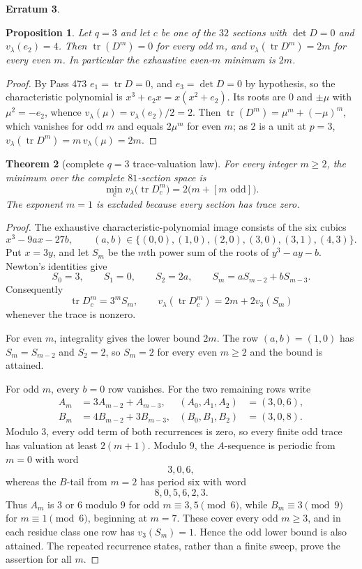 \documentclass[11pt]{article}
\theoremstyle{plain}
\newtheorem{theorem}{Theorem}
\newtheorem{proposition}[theorem]{Proposition}
\theoremstyle{definition}
\newtheorem{erratum}[theorem]{Erratum}
\newcommand{\tr}{\operatorname{tr}}
\newcommand{\vlam}{v_\lambda}
\begin{document}
\begin{erratum}
\begin{proposition}\label{prop:q3even}
Let $q=3$ and let $c$ be one of the $32$ sections with $\det D=0$ and
$\vlam(e_2)=4$. Then $\tr(D^m)=0$ for every odd $m$, and
$\vlam(\tr D^m)=2m$ for every even $m$. In particular the exhaustive even-$m$
minimum is $2m$.
\end{proposition}

\begin{proof}
By Pass 473 $e_1=\tr D=0$, and $e_3=\det D=0$ by hypothesis, so the
characteristic polynomial is $x^3+e_2x=x(x^2+e_2)$. Its roots are $0$ and
$\pm\mu$ with $\mu^2=-e_2$, whence $\vlam(\mu)=\vlam(e_2)/2=2$. Then
$\tr(D^m)=\mu^m+(-\mu)^m$, which vanishes for odd $m$ and equals $2\mu^m$ for
even $m$; as $2$ is a unit at $p=3$, $\vlam(\tr D^m)=m\,\vlam(\mu)=2m$.
\end{proof}

\begin{theorem}[complete $q=3$ trace-valuation law]\label{thm:q3allm}
For every integer $m\ge2$, the minimum over the complete $81$-section space is
\[
 \min_c\vlam\bigl(\tr D_c^m\bigr)
   =2\bigl(m+[m\text{ odd}]\bigr).
\]
The exponent $m=1$ is excluded because every section has trace zero.
\end{theorem}

\begin{proof}
The exhaustive characteristic-polynomial image consists of the six cubics
\[
 x^3-9a x-27b,
 \qquad
 (a,b)\in\{(0,0),(1,0),(2,0),(3,0),(3,1),(4,3)\}.
\]
Put $x=3y$, and let $S_m$ be the $m$th power sum of the roots of
$y^3-ay-b$. Newton's identities give
\[
 S_0=3,\qquad S_1=0,\qquad S_2=2a,\qquad
 S_m=aS_{m-2}+bS_{m-3}.
\]
Consequently
\[
 \tr D_c^m=3^mS_m,
 \qquad
 \vlam(\tr D_c^m)=2m+2v_3(S_m)
\]
whenever the trace is nonzero.

For even $m$, integrality gives the lower bound $2m$.  The row
$(a,b)=(1,0)$ has $S_m=S_{m-2}$ and $S_2=2$, so $S_m=2$ for every even
$m\ge2$ and the bound is attained.

For odd $m$, every $b=0$ row vanishes. For the two remaining rows write
\[
 \begin{aligned}
 A_m&=3A_{m-2}+A_{m-3}, &(A_0,A_1,A_2)&=(3,0,6),\\
 B_m&=4B_{m-2}+3B_{m-3}, &(B_0,B_1,B_2)&=(3,0,8).
 \end{aligned}
\]
Modulo $3$, every odd term of both recurrences is zero, so every finite odd
trace has valuation at least $2(m+1)$. Modulo $9$, the $A$-sequence is
periodic from $m=0$ with word
\[
 3,0,6,
\]
whereas the $B$-tail from $m=2$ has period six with word
\[
 8,0,5,6,2,3.
\]
Thus $A_m$ is $3$ or $6$ modulo $9$ for odd
$m\equiv3,5\pmod6$, while $B_m\equiv3\pmod9$ for
$m\equiv1\pmod6$, beginning at $m=7$. These cover every odd $m\ge3$, and in
each residue class one row has $v_3(S_m)=1$. Hence the odd lower bound is also
attained. The repeated recurrence states, rather than a finite sweep, prove
the assertion for all $m$.
\end{proof}


\end{erratum}
\end{document}
